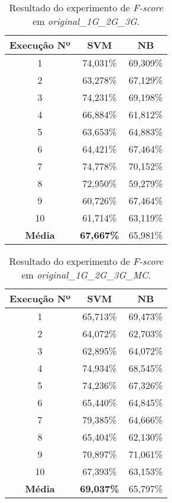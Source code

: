 \begin{table}[h]
    \centering
    \begin{tabular}{c c c}
        \hline
        {\bf Execução Nº} & {\bf SVM} & {\bf NB} \\
        \hline
        1 & 74,031\% & 69,309\% \\
        2 & 63,278\% & 67,129\% \\
        3 & 74,231\% & 69,198\% \\
        4 & 66,884\% & 61,812\% \\
        5 & 63,653\% & 64,883\% \\
        6 & 64,421\% & 67,464\% \\
        7 & 74,778\% & 70,152\% \\
        8 & 72,950\% & 59,279\% \\
        9 & 60,726\% & 67,464\% \\
        10 & 61,714\% & 63,119\% \\
        \hline
        {\bf Média} & {\bf 67,667\%} & 65,981\% \\
        \hline
    \end{tabular}
    \caption{Resultado do experimento de {\it F-score} em {\it original\_1G\_2G\_3G}.}
    \label{tab:resultados-li-ori-1g-2g-3g}
\end{table}

\begin{table}[h]
    \centering
    \begin{tabular}{c c c}
        \hline
        {\bf Execução Nº} & {\bf SVM} & {\bf NB} \\
        \hline
        1 & 65,713\% & 69,473\% \\
        2 & 64,072\% & 62,703\% \\
        3 & 62,895\% & 64,072\% \\
        4 & 74,934\% & 68,545\% \\
        5 & 74,236\% & 67,326\% \\
        6 & 65,440\% & 64,845\% \\
        7 & 79,385\% & 64,666\% \\
        8 & 65,404\% & 62,130\% \\
        9 & 70,897\% & 71,061\% \\
        10 & 67,393\% & 63,153\% \\
        \hline
        {\bf Média} & {\bf 69,037\%} & 65,797\% \\
        \hline
    \end{tabular}
    \caption{Resultado do experimento de {\it F-score} em {\it original\_1G\_2G\_3G\_MC}.}
    \label{tab:resultados-li-ori-1g-2g-3g-mc}
\end{table}

